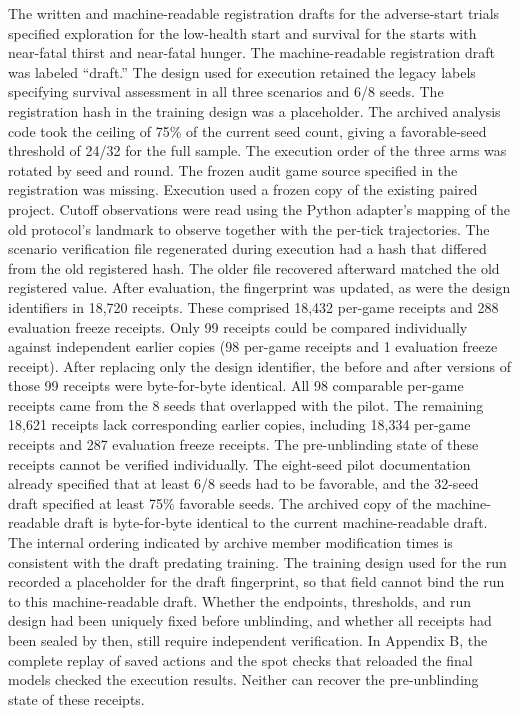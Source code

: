 \documentclass{article}
\begin{document}
The written and machine-readable registration drafts for the adverse-start trials specified exploration for the low-health start and survival for the starts with near-fatal thirst and near-fatal hunger. The machine-readable registration draft was labeled “draft.” The design used for execution retained the legacy labels specifying survival assessment in all three scenarios and 6/8 seeds. The registration hash in the training design was a placeholder. The archived analysis code took the ceiling of 75\% of the current seed count, giving a favorable-seed threshold of 24/32 for the full sample. The execution order of the three arms was rotated by seed and round. The frozen audit game source specified in the registration was missing. Execution used a frozen copy of the existing paired project. Cutoff observations were read using the Python adapter’s mapping of the old protocol’s landmark to observe together with the per-tick trajectories. The scenario verification file regenerated during execution had a hash that differed from the old registered hash. The older file recovered afterward matched the old registered value. After evaluation, the fingerprint was updated, as were the design identifiers in 18,720 receipts. These comprised 18,432 per-game receipts and 288 evaluation freeze receipts. Only 99 receipts could be compared individually against independent earlier copies (98 per-game receipts and 1 evaluation freeze receipt). After replacing only the design identifier, the before and after versions of those 99 receipts were byte-for-byte identical. All 98 comparable per-game receipts came from the 8 seeds that overlapped with the pilot. The remaining 18,621 receipts lack corresponding earlier copies, including 18,334 per-game receipts and 287 evaluation freeze receipts. The pre-unblinding state of these receipts cannot be verified individually. The eight-seed pilot documentation already specified that at least 6/8 seeds had to be favorable, and the 32-seed draft specified at least 75\% favorable seeds. The archived copy of the machine-readable draft is byte-for-byte identical to the current machine-readable draft. The internal ordering indicated by archive member modification times is consistent with the draft predating training. The training design used for the run recorded a placeholder for the draft fingerprint, so that field cannot bind the run to this machine-readable draft. Whether the endpoints, thresholds, and run design had been uniquely fixed before unblinding, and whether all receipts had been sealed by then, still require independent verification. In Appendix B, the complete replay of saved actions and the spot checks that reloaded the final models checked the execution results. Neither can recover the pre-unblinding state of these receipts.
\end{document}
